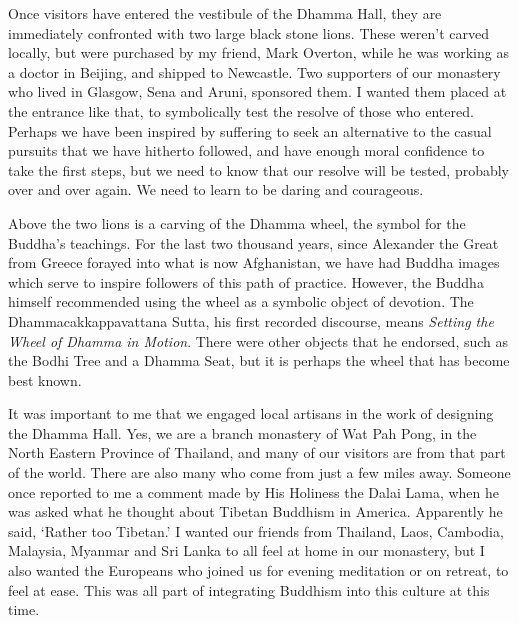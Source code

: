 
\enlargethispage{2\baselineskip}

Once visitors have entered the vestibule of the Dhamma Hall, they are
immediately confronted with two large black stone lions. These weren't
carved locally, but were purchased by my friend, Mark Overton, while he
was working as a doctor in Beijing, and shipped to Newcastle. Two
supporters of our monastery who lived in Glasgow, Sena and Aruni,
sponsored them. I wanted them placed at the entrance like that, to
symbolically test the resolve of those who entered. Perhaps we have been
inspired by suffering to seek an alternative to the casual pursuits that
we have hitherto followed, and have enough moral confidence to take the
first steps, but we need to know that our resolve will be tested,
probably over and over again. We need to learn to be daring and
courageous.

Above the two lions is a carving of the Dhamma wheel, the symbol for the
Buddha's teachings. For the last two thousand years, since Alexander the
Great from Greece\cite{greco} forayed into what is now Afghanistan, we have had Buddha
images which serve to inspire followers of this path of practice.
However, the Buddha himself recommended using the wheel as a symbolic
object of devotion. The Dhammacakkappavattana Sutta, his first
recorded discourse, means \emph{Setting the Wheel of Dhamma in Motion}\cite{cakka}.
There were other objects that
he endorsed, such as the Bodhi Tree and a Dhamma Seat, but it is perhaps
the wheel that has become best known.

\enlargethispage*{\baselineskip}

It was important to me that we engaged local artisans in the work of
designing the Dhamma Hall. Yes, we are a branch monastery of Wat Pah
Pong, in the North Eastern Province of Thailand, and many of our visitors are from that part
of the world. There are also many who come from just a few miles away.
Someone once reported to me a comment made by His Holiness the Dalai
Lama, when he was asked what he thought about Tibetan Buddhism in
America. Apparently he said, `Rather too Tibetan.' I wanted our friends
from Thailand, Laos, Cambodia, Malaysia, Myanmar and Sri Lanka to all
feel at home in our monastery, but I also wanted the Europeans who
joined us for evening meditation or on retreat, to feel at ease. This
was all part of integrating Buddhism into this culture at this time.

